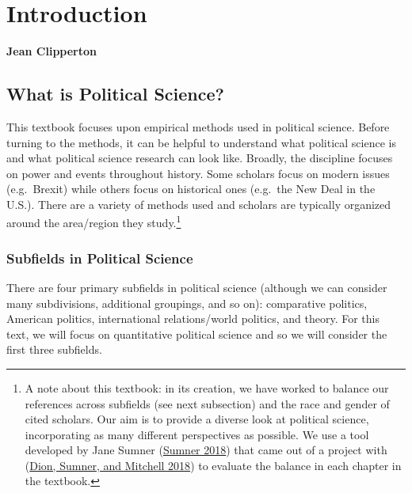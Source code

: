 \documentclass{book}
\begin{document}
\setcounter{tocdepth}{3}
\tableofcontents

\mainmatter

\hypertarget{introduction}{%
\chapter{Introduction}\label{introduction}}

\textbf{Jean Clipperton}

\hypertarget{what-is-political-science}{%
\section{What is Political Science?}\label{what-is-political-science}}

This textbook focuses upon empirical methods used in political science. Before
turning to the methods, it can be helpful to understand what political science
is and what political science research can look like. Broadly, the discipline
focuses on power and events throughout history. Some scholars focus on modern
issues (e.g.~Brexit) while others focus on historical ones (e.g.~the New Deal
in the U.S.). There are a variety of methods used and scholars are typically
organized around the area/region they study.\footnote{A note about this
  textbook: in its creation, we have worked to balance our references across
  subfields (see next subsection) and the race and gender of cited scholars.
  Our aim is to provide a diverse look at political science, incorporating as
  many different perspectives as possible. We use a tool developed by Jane
  Sumner (\protect\hyperlink{ref-sumner_2018}{Sumner 2018}) that came out of a
  project with (\protect\hyperlink{ref-dion_sumner_mitchell_2018}{Dion,
  Sumner, and Mitchell 2018}) to evaluate the balance in each chapter in the
  textbook.}

\hypertarget{subfields-in-political-science}{%
\subsection{Subfields in Political
Science}\label{subfields-in-political-science}}

There are four primary subfields in political science (although we can
consider many subdivisions, additional groupings, and so on): comparative
politics, American politics, international relations/world politics, and
theory. For this text, we will focus on quantitative political science and so
we will consider the first three subfields.
\end{document}
